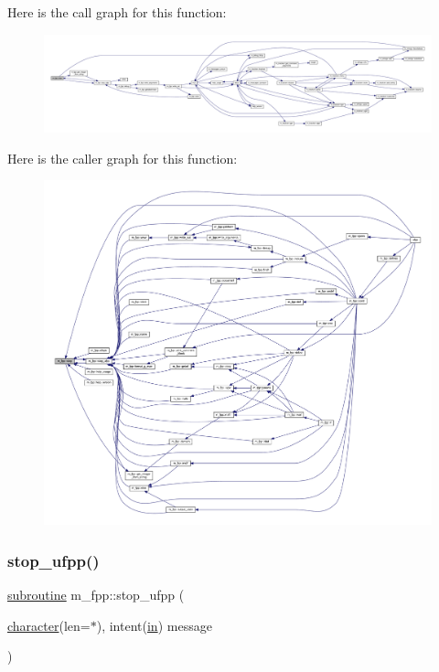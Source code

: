 Here is the call graph for this function\+:
\nopagebreak
\begin{figure}[H]
\begin{center}
\leavevmode
\includegraphics[width=350pt]{namespacem__fpp_a636643b9e9981243fa2206a3368d01bf_cgraph}
\end{center}
\end{figure}
Here is the caller graph for this function\+:
\nopagebreak
\begin{figure}[H]
\begin{center}
\leavevmode
\includegraphics[width=350pt]{namespacem__fpp_a636643b9e9981243fa2206a3368d01bf_icgraph}
\end{center}
\end{figure}
\mbox{\label{namespacem__fpp_a0cff320eaa7ee0c4ed98a6ecb9ecee0b}} 
\subsubsection{\texorpdfstring{stop\+\_\+ufpp()}{stop\_ufpp()}}
{\footnotesize\ttfamily \hyperlink{M__stopwatch_83_8txt_acfbcff50169d691ff02d4a123ed70482}{subroutine} m\+\_\+fpp\+::stop\+\_\+ufpp (\begin{DoxyParamCaption}\item[{\hyperlink{option__stopwatch_83_8txt_abd4b21fbbd175834027b5224bfe97e66}{character}(len=$\ast$), intent(\hyperlink{M__journal_83_8txt_afce72651d1eed785a2132bee863b2f38}{in})}]{message }\end{DoxyParamCaption})}



